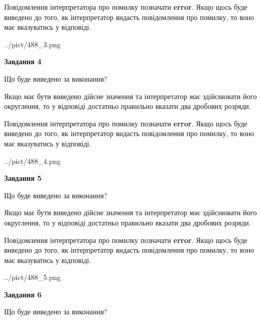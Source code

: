 \documentclass[12pt, ukrainian]{article}
\begin{document}
{\begin {Large}
Повідомлення інтерпретатора про помилку позначати \textbf{error}.
Якщо щось буде виведено до того, як інтерпретатор видасть повідомлення про помилку, 
то воно має вказуватись у відповіді. \par

\begin{center}
	{../pict/488_3.png}
\end{center}
\newpage

{\begin {center}\textbf{Завдання 4}\end {center}}\par
Що буде виведено за виконання? \par

Якщо має бути виведено дійсне значення та інтерпретатор має здійснювати його округлення, 
то у відповіді достатньо правильно вказати два дробових розряди.

Повідомлення інтерпретатора про помилку позначати \textbf{error}.
Якщо щось буде виведено до того, як інтерпретатор видасть повідомлення про помилку, 
то воно має вказуватись у відповіді. \par

\begin{center}
	{../pict/488_4.png}
\end{center}
\newpage

{\begin {center}\textbf{Завдання 5}\end {center}}\par
Що буде виведено за виконання? \par

Якщо має бути виведено дійсне значення та інтерпретатор має здійснювати його округлення, 
то у відповіді достатньо правильно вказати два дробових розряди.

Повідомлення інтерпретатора про помилку позначати \textbf{error}.
Якщо щось буде виведено до того, як інтерпретатор видасть повідомлення про помилку, 
то воно має вказуватись у відповіді. \par

\begin{center}
	{../pict/488_5.png}
\end{center}
\newpage

{\begin {center}\textbf{Завдання 6}\end {center}}\par
Що буде виведено за виконання? \par


\end{Large}}
\end{document}
